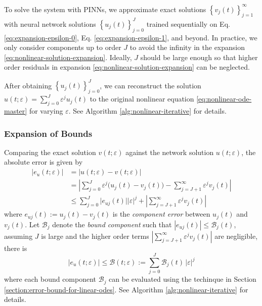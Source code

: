 \documentclass[accepted]{uai2023}
\newcommand{\Err}{e}
\newcommand{\Bound}{\mathcal{B}}
\begin{document}
    To solve the system with PINNs, we approximate exact solutions $\left\{v_j(t)\right\}_{j=1}^{\infty}$ with neural network solutions $\left\{u_j(t)\right\}_{j=0}^{J}$ trained sequentially on Eq. \ref{eq:expansion-epsilon-0}, Eq. \ref{eq:expansion-epsilon-1}, and beyond. 
    In practice, we only consider components up to order $J$ to avoid the infinity in the expansion \ref{eq:nonlinear-solution-expansion}. 
    Ideally, $J$ should be large enough so that higher order residuals in expansion \ref{eq:nonlinear-solution-expansion} can be neglected.

    After obtaining $\left\{u_j(t)\right\}_{j=0}^{J}$, we can reconstruct the solution $u(t;\varepsilon) = \sum_{j=0}^{J} \varepsilon^j u_j(t)$ to the original nonlinear equation \ref{eq:nonlinear-ode-master} for varying $\varepsilon$.
    See Algorithm \ref{alg:nonlinear-iterative} for details.

\subsubsection{Expansion of Bounds}
    Comparing the exact solution $v(t; \varepsilon)$ against the network solution $u(t; \varepsilon)$, the absolute error is given by 
    {
        \small
        \begin{align}
            |\Err_u(t; \varepsilon)| &= \Big|u(t; \varepsilon) - v(t; \varepsilon)\Big| \nonumber \\
            &= \left|\sum_{j=0}^{J} \varepsilon^{j} \Big(u_j(t) - v_j(t)\Big) - \sum_{j=J+1}^{\infty} \varepsilon^j v_j(t)\right| \nonumber \\
            &\leq \sum_{j=0}^{J} \Big|\Err_{uj}(t)\Big||\varepsilon|^j + \left|\sum_{j=J+1}^{\infty}\varepsilon^j v_j(t)\right|
        \end{align}
    }
    where $\Err_{uj}(t) := u_j(t) - v_j(t)$ is the \textit{component error} between $u_j(t)$ and $v_j(t)$.
    Let $\Bound_{j}$ denote the \textit{bound component} such that $|\Err_{uj}(t)| \leq \Bound_j(t)$, assuming $J$ is large and the higher order terms $\left|\sum_{j=J+1}^{\infty}\varepsilon^j v_j(t)\right|$ are negligible, there is 
    {
        \small
        \begin{equation} \label{eq:nonlinear-bound-components}
            \Big|\Err_u(t; \varepsilon)\Big| \leq \Bound(t; \varepsilon) := \sum_{j=0}^{J} \Bound_j(t)\,|\varepsilon|^j 
        \end{equation}
    }
    where each bound component $\Bound_j$ can be evaluated using the techinque in Section \ref{section:error-bound-for-linear-odes}. 
    See Algorithm \ref{alg:nonlinear-iterative} for details.
\end{document}
